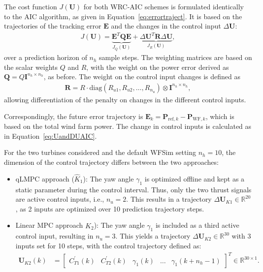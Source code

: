 The cost function $J(\bm{U})$ for both WRC-AIC schemes is formulated identically to the AIC algorithm, as given in Equation~\eqref{eq:errortraject}. It is based on the trajectories of the tracking error $\bm{E}$ and the changes in the control input $\Delta \bm{U}$:
\begin{align*} 
    J(\bm{U}) = \underbrace{\bm{E}^T \bm{Q} \bm{E}}_{J_Q (\bm{U})} + \underbrace{\Delta \bm{U}^T \bm{R} \Delta \bm{U}}_{J_R (\bm{U})},
\end{align*}
over a prediction horizon of $n_h$ sample steps. The weighting matrices are based on the scalar weights $Q$ and $R$, with the weight on the power error derived as $\bm{Q} = Q \bm{I}^{n_h \times n_h}$, as before. The weight on the control input changes is defined as
\begin{align*}
    \bm{R} = R \cdot \mathrm{diag}(R_{u1}, R_{u2}, \dots, R_{n_u}) \otimes \bm{I}^{n_h \times n_h},
\end{align*}
allowing differentiation of the penalty on changes in the different control inputs.

Correspondingly, the future error trajectory is $\bm{E}_k = \bm{P}_{\text{ref},k} - \bm{P}_{\text{WF},k}$, which is based on the total wind farm power. The change in control inputs is calculated as in Equation~\eqref{eq:UandDUAIC}.

For the two turbines considered and the default WFSim setting $n_h = 10$, the dimension of the control trajectory differs between the two approaches:
\begin{itemize}
    \item qLMPC approach ($\hat{K}_1$): The yaw angle $\gamma_1$ is optimized offline and kept as a static parameter during the control interval. Thus, only the two thrust signals are active control inputs, i.e., $n_u = 2$. This results in a trajectory $\Delta \bm{U}_{K1} \in \mathbb{R}^{20}$, as 2 inputs are optimized over 10 prediction trajectory steps.
    \item Linear MPC approach $\hat{K}_2$): The yaw angle $\gamma_1$ is included as a third active control input, resulting in $n_u = 3$. This yields a trajectory $\Delta \bm{U}_{K2} \in \mathbb{R}^{30}$ with 3 inputs set for 10 steps, with the control trajectory defined as:
    \begin{align*} 
        \bm{U}_{K2}(k) &= \begin{bmatrix} 
            C_{T1}^\prime(k) & C_{T2}^\prime(k) & \gamma_1(k) & \dots & \gamma_1(k+n_h-1) 
        \end{bmatrix}^T \in \mathbb{R}^{30 \times 1}.
    \end{align*}
\end{itemize}

